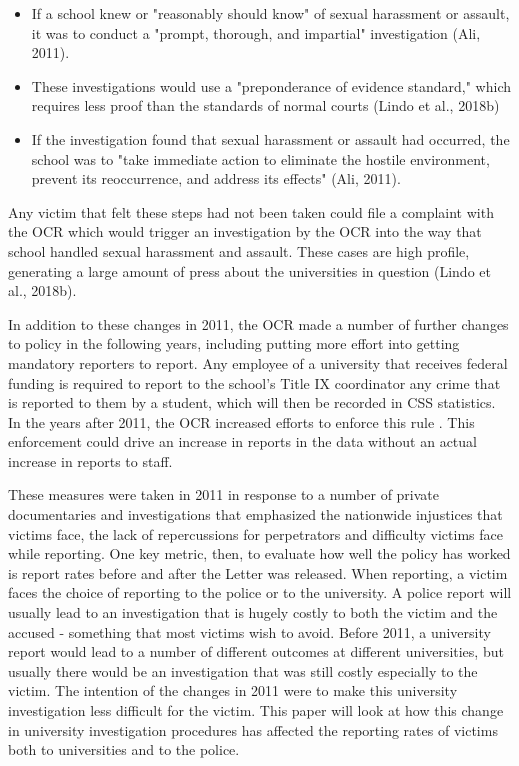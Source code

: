 \documentclass[AER]{AEA}
\begin{document}
\begin{itemize}

\item If a school knew or "reasonably should know" of sexual harassment or assault, it was to conduct a "prompt, thorough, and impartial" investigation (Ali, 2011).

\item These investigations would use a "preponderance of evidence standard," which requires less proof than the standards of normal courts (Lindo et al., 2018b)

\item If the investigation found that sexual harassment or assault had occurred, the school was to "take immediate action to eliminate the hostile environment, prevent its reoccurrence, and address its effects" (Ali, 2011). 

\end{itemize}

Any victim that felt these steps had not been taken could file a complaint with the OCR which would trigger an investigation by the OCR into the way that school handled sexual harassment and assault. These cases are high profile, generating a large amount of press about the universities in question (Lindo et al., 2018b). 

In addition to these changes in 2011, the OCR made a number of further changes to policy in the following years, including putting more effort into getting mandatory reporters to report. Any employee of a university that receives federal funding is required to report to the school's Title IX coordinator any crime that is reported to them by a student, which will then be recorded in CSS statistics. In the years after 2011, the OCR increased efforts to enforce this rule . This enforcement could drive an increase in reports in the data without an actual increase in reports to staff.

These measures were taken in 2011 in response to a number of private documentaries and investigations that emphasized the nationwide injustices that victims face, the lack of repercussions for perpetrators and difficulty victims face while reporting. One key metric, then, to evaluate how well the policy has worked is report rates before and after the Letter was released. When reporting, a victim faces the choice of reporting to the police or to the university. A police report will usually lead to an investigation that is hugely costly to both the victim and the accused - something that most victims wish to avoid. Before 2011, a university report would lead to a number of different outcomes at different universities, but usually there would be an investigation that was still costly especially to the victim. The intention of the changes in 2011 were to make this university investigation less difficult for the victim. This paper will look at how this change in university investigation procedures has affected the reporting rates of victims both to universities and to the police.
\end{document}
